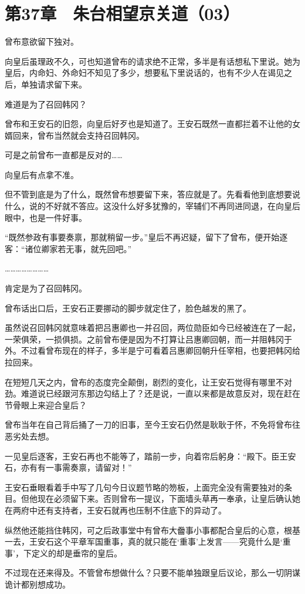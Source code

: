 \section{第37章　朱台相望京关道（03）}

曾布意欲留下独对。

向皇后虽理政不久，可也知道曾布的请求绝不正常，多半是有话想私下里说。她为皇后，内命妇、外命妇不知见了多少，想要私下里说话的，也有不少人在谒见之后，单独请求留下来。

难道是为了召回韩冈？

曾布和王安石的旧怨，向皇后好歹也是知道了。王安石既然一直都拦着不让他的女婿回来，曾布当然就会支持召回韩冈。

可是之前曾布一直都是反对的……

向皇后有点拿不准。

但不管到底是为了什么，既然曾布想要留下来，答应就是了。先看看他到底想要说什么，说的不好就不答应。这没什么好多犹豫的，宰辅们不再同进同退，在向皇后眼中，也是一件好事。

“既然参政有事要奏禀，那就稍留一步。”皇后不再迟疑，留下了曾布，便开始逐客：“诸位卿家若无事，就先回吧。”

……………………

肯定是为了召回韩冈。

曾布话出口后，王安石正要挪动的脚步就定住了，脸色越发的黑了。

虽然说召回韩冈就意味着把吕惠卿也一并召回，两位勋臣如今已经被连在了一起，一荣俱荣，一损俱损。之前曾布便是因为不打算让吕惠卿回朝，而一并阻韩冈于外。不过看曾布现在的样子，多半是宁可看着吕惠卿回朝升任宰相，也要把韩冈给拉回来。

在短短几天之内，曾布的态度完全颠倒，剧烈的变化，让王安石觉得有哪里不对劲。难道说已经跟河东那边勾结上了？还是说，一直以来都是故意反对，现在赶在节骨眼上来迎合皇后？

曾布当年在自己背后捅了一刀的旧事，至今王安石仍然是耿耿于怀，不免将曾布往恶劣处去想。

一见皇后逐客，王安石再也不能等了，踏前一步，向着帘后躬身：“殿下。臣王安石，亦有有一事需奏禀，请留对！”

王安石垂眼看着手中写了几句今日议题节略的笏板，上面完全没有需要独对的条目。但他现在必须留下来。否则曾布一提议，下面墙头草再一奉承，让皇后确认她在两府中还有支持者，王安石就再也压制不住底下的异动了。

纵然他还能挡住韩冈，可之后政事堂中有曾布大齤事小事都配合皇后的心意，根基一去，王安石这个平章军国重事，真的就只能在‘重事’上发言——究竟什么是‘重事’，下定义的却是垂帘的皇后。

不过现在还来得及。不管曾布想做什么？只要不能单独跟皇后议论，那么一切阴谋诡计都别想成功。

